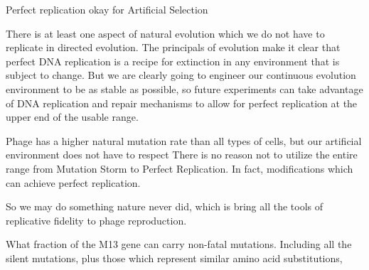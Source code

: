 \documentclass[10pt,letterpaper]{article}
\begin{document}
Perfect replication okay for Artificial Selection

There is at least one aspect of natural evolution which we do not have to replicate in directed evolution.  The principals of evolution make it clear that perfect DNA replication is a recipe for extinction in any environment that is subject to change.  But we are clearly going to engineer our continuous evolution environment to be as stable as possible, so future experiments can take advantage of DNA replication and repair mechanisms to allow for perfect replication at the upper end of the usable range.

Phage has a higher natural mutation rate than all types of cells, but our artificial environment does not have to respect
There is no reason not to utilize the entire range from Mutation Storm to Perfect Replication.  In fact, modifications which can achieve perfect replication.

So we may do something nature never did, which is bring all the tools of replicative fidelity to phage reproduction.

What fraction of the M13 gene can carry non-fatal mutations. Including all the silent mutations, plus those which represent similar amino acid substitutions,
\end{document}
